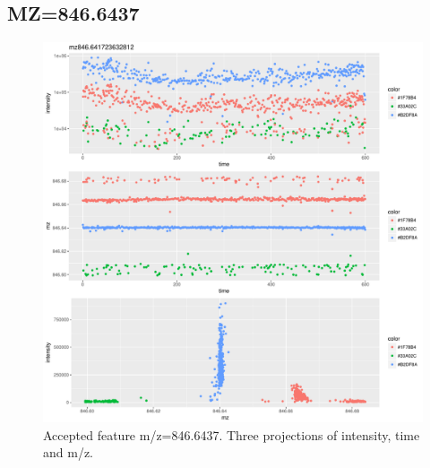 \documentclass[]{article}
\begin{document}
\subsection{MZ=846.6437}\label{mz846.6437}

\begin{figure}[H]
\begin{center}
\includegraphics{Supplementary_document_files/figure-latex/cluster.mz.846-1.pdf}
\caption{Accepted feature m/z=846.6437. Three projections of intensity, time and m/z.}
\label{fig:d3.mz.846.6437}
\end{center}
\end{figure}
\end{document}
